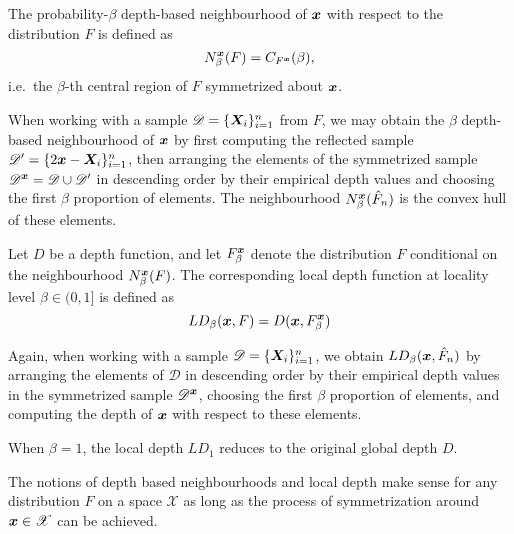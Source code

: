 \begin{definition}
    The probability-$\beta$ depth-based neighbourhood of $\bm{x}$ with respect to
    the distribution $F$ is defined as
    \begin{equation}
        N^{\bm{x}}_\beta(F) = C_{F^{\bm{x}}}(\beta),
    \end{equation}
    i.e.\ the $\beta$-th central region of $F$ symmetrized about $\bm{x}$.
\end{definition}

When working with a sample $\mathscr{D} = \{\bm{X}_i\}_{i = 1}^n$ from $F$, we
may obtain the $\beta$ depth-based neighbourhood of $\bm{x}$ by first computing
the reflected sample $\mathscr{D}' = \{2\bm{x} - \bm{X}_i\}_{i = 1}^n$, then
arranging the elements of the symmetrized sample $\mathscr{D}^{\bm{x}} =
\mathscr{D} \cup \mathscr{D}'$ in descending order by their empirical depth
values and choosing the first $\beta$ proportion of elements.
The neighbourhood $N^{\bm{x}}_\beta(\hat{F}_n)$ is the convex hull of these
elements.


\begin{definition}
    \label{def:localdepth}
    Let $D$ be a depth function, and let $F^{\bm{x}}_\beta$ denote the
    distribution $F$ conditional on the neighbourhood $N^{\bm{x}}_\beta(F)$.
    The corresponding local depth function at locality level $\beta \in (0,
    1]$ is defined as
    \begin{equation}
        LD_\beta(\bm{x}, F) = D(\bm{x}, F^{\bm{x}}_\beta)
    \end{equation}
\end{definition}

Again, when working with a sample $\mathscr{D} = \{\bm{X}_i\}_{i = 1}^n$, we
obtain $LD_\beta(\bm{x}, \hat{F}_n)$ by arranging the elements of $\mathscr{D}$
in descending order by their empirical depth values in the symmetrized sample
$\mathscr{D}^{\bm{x}}$, choosing the first $\beta$ proportion of elements, and
computing the depth of $\bm{x}$ with respect to these elements.

\begin{remark}
    When $\beta = 1$, the local depth $LD_1$ reduces to the original global
    depth $D$.
\end{remark}

\begin{remark}
    The notions of depth based neighbourhoods and local depth make sense for
    any distribution $F$ on a space $\mathscr{X}$ as long as the process of
    symmetrization around $\bm{x} \in \mathscr{X}$ can be achieved.
\end{remark}


